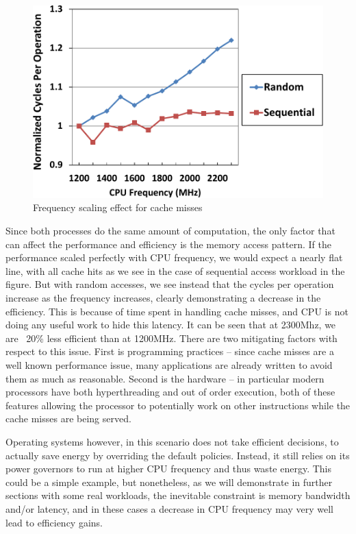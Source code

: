 \begin{figure}
  \begin{center}
\includegraphics[width=\linewidth]{figs/case-crop.pdf}
  \end{center}
  \vspace{-0.1in}
  \caption{Frequency scaling effect for cache misses}
	\label{fig:case}
\end{figure}

Since both processes do the same amount of computation, the only factor that can affect the performance and efficiency is the memory access pattern. 
If the performance scaled perfectly with CPU frequency, we would expect a nearly flat line, with all cache hits
as we see in the case of sequential access workload in the figure. 
But with random accesses, we see instead that the cycles per operation increase as the frequency increases, 
clearly demonstrating a decrease in the efficiency. This is because of time spent in handling cache misses, and 
CPU is not doing any useful work to hide this latency.
It can be seen that at 2300Mhz, we are ~20\% less efficient than at 1200MHz.
There are two mitigating factors with respect to this issue. First is programming practices -- since cache misses are a well known performance issue, 
many applications are already written to avoid them as much as reasonable. Second is the hardware -- in particular modern processors have both hyperthreading and out of order execution, 
both of these features allowing the processor to potentially work on other instructions while the cache misses
are being served. 

Operating systems however, in this scenario does not take efficient decisions, to actually save energy 
by overriding the default policies. Instead, it still relies on its power
governors to run at higher CPU frequency and thus waste energy. This could be a simple
example, but nonetheless, as we will demonstrate in further sections  with some real workloads, 
the inevitable constraint is memory bandwidth and/or latency, and in these cases a decrease in CPU frequency may very well lead to efficiency gains.



